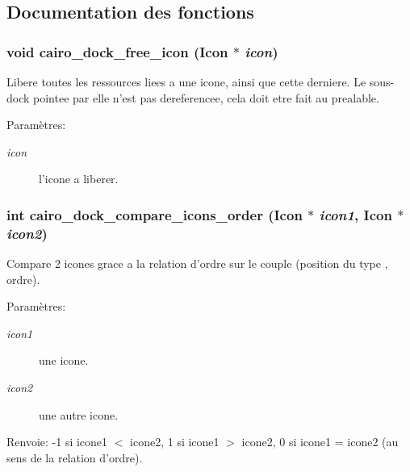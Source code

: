 \subsection{Documentation des fonctions}
\subsubsection{\setlength{\rightskip}{0pt plus 5cm}void cairo\_\-dock\_\-free\_\-icon ({\bf Icon} $\ast$ {\em icon})}\label{cairo-dock-icons_8h_f54199a4215a71f8b017ceb6512366f9}


Libere toutes les ressources liees a une icone, ainsi que cette derniere. Le sous-dock pointee par elle n'est pas dereferencee, cela doit etre fait au prealable. \begin{Desc}
\item[Paramètres:]
\begin{description}
\item[{\em icon}]l'icone a liberer. \end{description}
\end{Desc}
\subsubsection{\setlength{\rightskip}{0pt plus 5cm}int cairo\_\-dock\_\-compare\_\-icons\_\-order ({\bf Icon} $\ast$ {\em icon1}, {\bf Icon} $\ast$ {\em icon2})}\label{cairo-dock-icons_8h_a4e008f173bb3255251da119e4173c3b}


Compare 2 icones grace a la relation d'ordre sur le couple (position du type , ordre). \begin{Desc}
\item[Paramètres:]
\begin{description}
\item[{\em icon1}]une icone. \item[{\em icon2}]une autre icone. \end{description}
\end{Desc}
\begin{Desc}
\item[Renvoie:]-1 si icone1 $<$ icone2, 1 si icone1 $>$ icone2, 0 si icone1 = icone2 (au sens de la relation d'ordre). \end{Desc}
